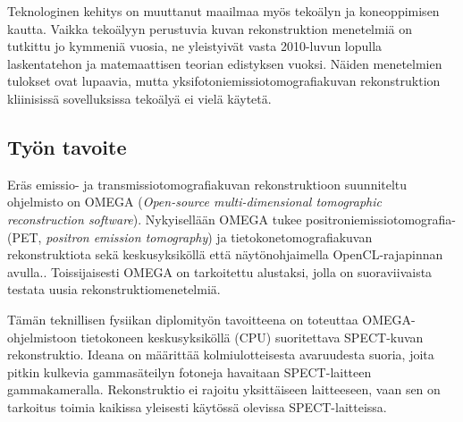 Teknologinen kehitys on muuttanut maailmaa myös tekoälyn ja koneoppimisen kautta. Vaikka tekoälyyn perustuvia kuvan rekonstruktion menetelmiä on tutkittu jo kymmeniä vuosia, ne yleistyivät vasta 2010-luvun lopulla laskentatehon ja matemaattisen teorian edistyksen vuoksi. Näiden menetelmien tulokset ovat lupaavia, mutta yksifotoniemissiotomografiakuvan rekonstruktion kliinisissä sovelluksissa tekoälyä ei vielä käytetä.\cite{shao_artificial_2021}

\subsection{Työn tavoite}
Eräs emissio- ja transmissiotomografiakuvan rekonstruktioon suunniteltu ohjelmisto on OMEGA (\textit{Open-source multi-dimensional tomographic reconstruction software}). Nykyisellään OMEGA tukee positroniemissiotomografia- (PET, \textit{positron emission tomography}) ja tietokonetomografiakuvan rekonstruktiota sekä keskusyksiköllä että näytönohjaimella OpenCL-rajapinnan avulla.\cite{wettenhovi_omegaopen-source_2021}. Toissijaisesti OMEGA on tarkoitettu alustaksi, jolla on suoraviivaista testata uusia rekonstruktiomenetelmiä. 

Tämän teknillisen fysiikan diplomityön tavoitteena on toteuttaa OMEGA-ohjelmistoon tietokoneen keskusyksiköllä (CPU) suoritettava SPECT-kuvan rekonstruktio. Ideana on määrittää kolmiulotteisesta avaruudesta suoria, joita pitkin kulkevia gammasäteilyn fotoneja havaitaan SPECT-laitteen gammakameralla. Rekonstruktio ei rajoitu yksittäiseen laitteeseen, vaan sen on tarkoitus toimia kaikissa yleisesti käytössä olevissa SPECT-laitteissa.